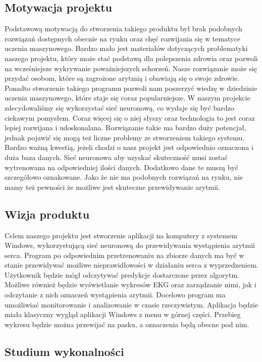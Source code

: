 \documentclass[polish,12pt]{aghthesis}
\begin{document}
\subsection{Motywacja projektu}

Podstawową motywacją do stworzenia takiego produktu był brak podobnych rozwiązań dostępnych obecnie na rynku oraz chęć rozwijania się w tematyce uczenia maszynowego.
Bardzo mało jest materiałów dotyczących problematyki naszego projektu, który może stać podstawą dla polepszenia zdrowia oraz pozwoli na wcześniejsze wykrywanie poważniejszych schorzeń. Nasze rozwiązanie może się przydać osobom, które są zagrożone arytmią i obawiają się o swoje zdrowie. Ponadto stworzenie takiego programu pozwoli nam poszerzyć wiedzę w dziedzinie uczenia maszynowego, które staje się coraz popularniejsze. W naszym projekcie zdecydowaliśmy się wykorzystać sieć neuronową, co wydaje się być bardzo ciekawym pomysłem. Coraz więcej się o niej słyszy oraz technologia to jest coraz lepiej rozwijana i udoskonalana. Rozwiązanie takie ma bardzo duży potencjał, jednak pojawić się mogą też liczne problemy ze stworzeniem takiego systemu. Bardzo ważną kwestią, jeżeli chodzi o nasz projekt jest odpowiednio oznaczona i duża baza danych.
Sieć neuronowa aby uzyskać skuteczność musi zostać wytrenowana na odpowiedniej ilości danych. Dodatkowo dane te muszą być szczegółowo oznakowane. Jako że nie ma podobnych rozwiązań na rynku, nie mamy też pewności że możliwe jest skuteczne przewidywanie arytmii.

\subsection{Wizja produktu}

Celem naszego projektu jest stworzenie aplikacji na komputery z systemem Windows, wykorzystującą sieć neuronową do przewidywania wystąpienia arytmii serca. Program po odpowiednim przetrenowaniu na zbiorze danych ma być w stanie przewidywać możliwe nieprawidłowości w działaniu serca z wyprzedzeniem. Użytkownik będzie mógł odczytywać predykcje dostarczone przez algorytm. Możliwe również będzie wyświetlanie wykresów EKG oraz zarządzanie nimi, jak i odczytanie z nich oznaczeń wystąpienia arytmii. Docelowo program ma umożliwiać monitorowanie i analizowanie w czasie rzeczywistym. Aplikacja będzie miała klasyczny wygląd aplikacji Windows z menu w górnej części. Przebieg wykresu będzie można przewijać na pasku, a oznaczenia będą obecne pod nim.

\subsection{Studium wykonalności}
\end{document}
